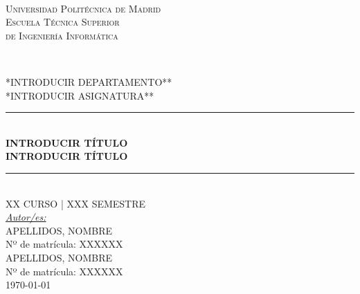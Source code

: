 \documentclass[12pt,a4paper, spanish]{article}
\begin{document}
\begin{titlepage}
  \newcommand{\HRule}{\rule{\linewidth}{0.5mm}}
  \centering

  \textsc{}\\[0.25cm]

  \textsc{\huge{Universidad Politécnica de Madrid}}\\[0.5cm]

  \textsc{\LARGE Escuela Técnica Superior\\ de Ingeniería Informática}\\[0.3cm]

  \begin{figure}[H] %
    \centering
    \qquad
    \\[0.5cm]
  \end{figure}

  \textsc{\Large **INTRODUCIR DEPARTAMENTO**}\\[0.25cm]
  \textsc{\large **INTRODUCIR ASIGNATURA**}\\[0.25cm]

  \HRule\\[0.4cm]

  {\huge\bfseries INTRODUCIR TÍTULO\\[0.4cm] INTRODUCIR TÍTULO}\\[0.4cm]
  \HRule\\[1.25cm]


  \textsc{\large XX CURSO | XXX SEMESTRE}\\[1.5cm]

  {\large\underline{\textit{Autor/es:}}}\\[0.2cm]
     \textsc{APELLIDOS, NOMBRE}\\
             Nº de matrícula: XXXXXX\\
     [0.5cm]
     \textsc{APELLIDOS, NOMBRE}\\
             Nº de matrícula: XXXXXX\\[0.5cm]

   \vfill\vfill\vfill
   {\large\today}

\end{titlepage}
\end{document}
